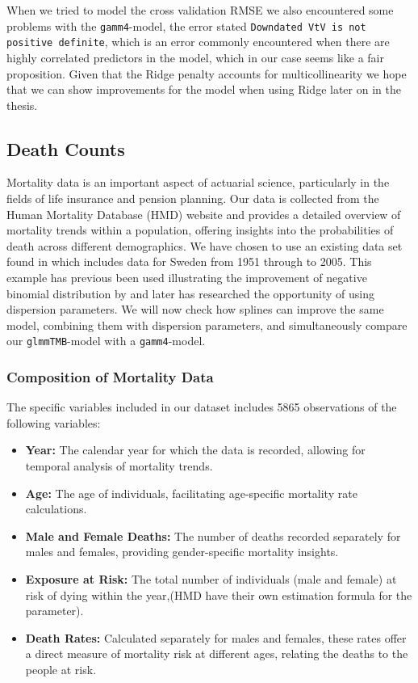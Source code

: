 \documentclass[12pt, twoside,hidelinks]{article}
\theoremstyle{definition}
\numberwithin{equation}{section}
\begin{document}
When we tried to model the cross validation RMSE we also encountered some problems with the \texttt{gamm4}-model, the error stated \texttt{Downdated VtV is not positive definite}, which is an error commonly encountered when there are highly correlated predictors in the model, which in our case seems like a fair proposition. Given that the Ridge penalty accounts for multicollinearity we hope that we can show improvements for the model when using Ridge later on in the thesis.



\subsection{Death Counts}\label{sec:analysis:mortality_data}


Mortality data is an important aspect of actuarial science, particularly in the fields of life insurance and pension planning. Our data is collected from the Human Mortality Database (HMD) website and provides a detailed overview of mortality trends within a population, offering insights into the probabilities of death across different demographics. We have chosen to use an existing data set found in \citet[p.~17]{deJong2008} which includes data for Sweden from 1951 through to 2005.  
This example has previous been used illustrating the improvement of negative binomial distribution  by \citet[p.~91-94]{deJong2008} and later \citet{grindheim} has researched the opportunity of using dispersion parameters. We will now check how splines can improve the same model, combining them with dispersion parameters, and simultaneously compare our \texttt{glmmTMB}-model with a \texttt{gamm4}-model.


\subsubsection*{Composition of Mortality Data}
The specific variables included in our dataset includes 5865 observations of the following variables:
\begin{itemize}
    \item \textbf{Year:} The calendar year for which the data is recorded, allowing for temporal analysis of mortality trends.
    \item \textbf{Age:} The age of individuals, facilitating age-specific mortality rate calculations.
    \item \textbf{Male and Female Deaths:} The number of deaths recorded separately for males and females, providing gender-specific mortality insights.
    \item \textbf{Exposure at Risk:} The total number of individuals (male and female) at risk of dying within the year,(HMD have their own estimation formula for the parameter).
    \item \textbf{Death Rates:} Calculated separately for males and females, these rates offer a direct measure of mortality risk at different ages, relating the deaths to the people at risk.
\end{itemize}
\end{document}
